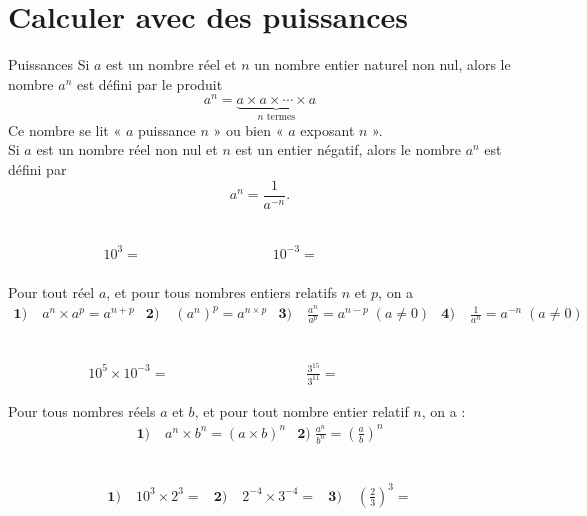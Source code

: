 \documentclass[11pt]{article}
\begin{document}
\section{Calculer avec des puissances}
\begin{defi}{Puissances}
 Si $a$ est un nombre réel et $n$ un nombre entier naturel non nul, alors le
 nombre $a^n$ est défini par le produit
 \[
   a^n = \underbrace{a\times a\times \cdots\times a}_{n\text{ termes}}
 \]
 Ce nombre se lit « $a$ puissance $n$ » ou bien « $a$ exposant $n$ ».\\[1mm]
 Si $a$ est un nombre réel non nul et $n$ est un entier négatif, alors le nombre
 $a^n$ est défini par
 \[
   a^n = \frac{1}{a^{-n}}.
 \]
\end{defi}
\begin{exemple}~\\[-11mm]
  \begin{align*}
    & 10^3 =\phantom{ 10\times10\times10 = 1000 }&
    10^{-3} =\phantom{\frac{1}{10^3} = \frac{1}{1000}=0,001}
  \end{align*}
\end{exemple}
\begin{prop}
  Pour tout réel $a$, et pour tous nombres entiers relatifs $n$ et $p$, on a
  \begin{align*}
    \textbf{1)}\;& a^n\times a^p=a^{n+p} &
    \textbf{2)}\;& \left( a^n \right)^p=a^{n\times p} &
    \textbf{3)}\;& \frac{a^n}{a^p} = a^{n-p}\;(a\neq0) &
    \textbf{4)}\;& \frac{1}{a^n}=a^{-n}\;(a\neq0)
  \end{align*}
\end{prop}
\begin{exemple}~\\[-11mm]
  \begin{align*}
    & 10^5\times10^{-3}=\phantom{10^{5-3}=10^2=100 }&
    & \frac{3^{15}}{3^{11}}=\phantom{ 3^{15-11}=3^4=81}
  \end{align*}
\end{exemple}

\begin{prop}
  Pour tous nombres réels $a$ et $b$, et pour tout nombre entier relatif $n$, on
  a :
  \begin{align*}
    \textbf{1)}\; & a^n\times b^n = (a\times b)^n & \textbf{2)}\;\frac{a^n}{b^n}=\left( \frac{a}{b}
    \right)^n
  \end{align*}
\end{prop}
\begin{exemple}~\\[-11mm]
  \begin{align*}
    \textbf{1)}\;& 10^3\times2^3 = &
    \textbf{2)}\;& 2^{-4}\times3^{-4} = &
    \textbf{3)}\;& \left( \frac{2}{3} \right)^3 =
  \end{align*}
\end{exemple}
\end{document}
